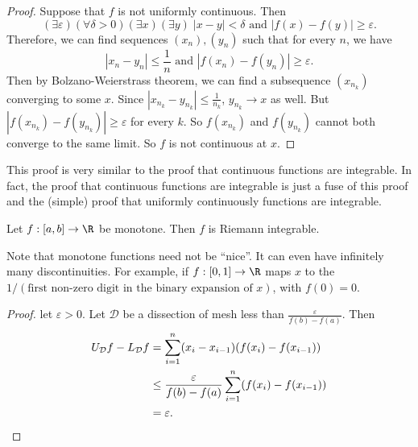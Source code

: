 \documentclass[a4paper]{article}
\begin{document}
\begin{proof}
  Suppose that $f$ is not uniformly continuous. Then
  \[
    (\exists \varepsilon)(\forall \delta > 0)(\exists x)(\exists y)\;|x - y| < \delta \text{ and } |f(x) - f(y)| \geq \varepsilon.
  \]
  Therefore, we can find sequences $(x_n), (y_n)$ such that for every $n$, we have
  \[
    |x_n - y_n| \leq \frac{1}{n}\text{ and }|f(x_n) - f(y_n)| \geq \varepsilon.
  \]
  Then by Bolzano-Weierstrass theorem, we can find a subsequence $(x_{n_k})$ converging to some $x$. Since $|x_{n_k} - y_{n_k}| \leq \frac{1}{n_k}$, $y_{n_k}\to x$ as well. But $|f(x_{n_k}) - f(y_{n_k})| \geq \varepsilon$ for every $k$. So $f(x_{n_k})$ and $f(y_{n_k})$ cannot both converge to the same limit. So $f$ is not continuous at $x$.
\end{proof}
This proof is very similar to the proof that continuous functions are integrable. In fact, the proof that continuous functions are integrable is just a fuse of this proof and the (simple) proof that uniformly continuously functions are integrable.

\begin{thm}
  Let $f: [a, b] \to \R$ be monotone. Then $f$ is Riemann integrable.
\end{thm}
Note that monotone functions need not be ``nice''. It can even have infinitely many discontinuities. For example, if $f: [0, 1] \to \R$ maps $x$ to the $1/(\text{first non-zero digit in the binary expansion of }x)$, with $f(0) = 0$.

\begin{proof}
  let $\varepsilon > 0$. Let $\mathcal{D}$ be a dissection of mesh less than $\frac{\varepsilon}{f(b) - f(a)}$. Then
  \begin{align*}
    U_\mathcal{D} f - L_\mathcal{D}f &= \sum_{i = 1}^n (x_i - x_{i - 1})(f(x_i) - f(x_{i - 1}))\\
    &\leq \frac{\varepsilon}{f(b) - f(a)} \sum_{i = 1}^n (f(x_i) - f(x_{i - 1}))\\
    &= \varepsilon.\qedhere
  \end{align*}
\end{proof}
\end{document}
